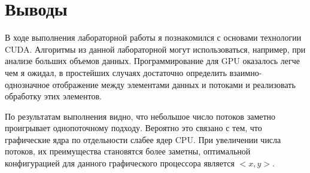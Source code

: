 \section{Выводы}
В ходе выполнения лабораторной работы я познакомился с основами технологии CUDA. 
Алгоритмы из данной лабораторной могут использоваться, например, при анализе больших объемов данных. 
Программирование для GPU оказалось легче чем я ожидал, в простейших случаях достаточно определить взаимно-однозначное отображение между элементами данных и потоками
 и реализовать обработку этих элементов.

По результатам выполнения видно, что небольшое число потоков заметно проигрывает однопоточному подходу. 
Вероятно это связано с тем, что графические ядра по отдельности слабее ядер CPU. 
При увеличении числа потоков, их преимущества становятся более заметны, оптимальной конфигурацией для данного графического процессора является $<x, y>$.

\pagebreak
